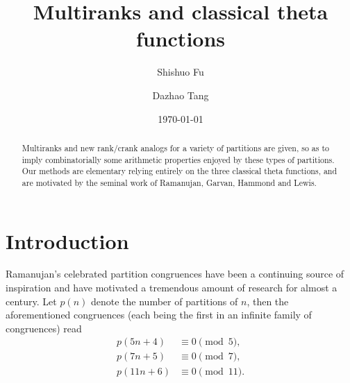 \documentclass[12pt]{amsart}
\numberwithin{equation}{section}
\theoremstyle{plain}
\theoremstyle{definition}
\begin{document}
\title[Multiranks and classical theta functions]{Multiranks and classical theta functions}


\author[S. Fu]{Shishuo Fu}
\address[Shishuo Fu]{College of Mathematics and Statistics, Chongqing University, Huxi Campus LD506, Chongqing 401331, P.R. China}


\author[D. Tang]{Dazhao Tang}

\address[Dazhao Tang]{College of Mathematics and Statistics, Chongqing University, Huxi Campus LD208, Chongqing 401331, P.R. China}

\date{\today}


\begin{abstract}
Multiranks and new rank/crank analogs for a variety of partitions are given, so as to imply combinatorially some arithmetic properties enjoyed by these types of partitions. Our methods are elementary relying entirely on the three classical theta functions, and are motivated by the seminal work of Ramanujan, Garvan, Hammond and Lewis.
\end{abstract}




\maketitle


\section{Introduction}\label{sec:intro}

Ramanujan's celebrated partition congruences have been a continuing source of inspiration and have motivated a tremendous amount of research for almost a century. Let $p(n)$ denote the number of partitions of $n$, then the aforementioned congruences (each being the first in an infinite family of congruences) read
\begin{align}
\label{p5}p(5n+4)&\equiv 0 \pmod 5,\\
\label{p7}p(7n+5)&\equiv 0 \pmod 7,\\
\label{p11}p(11n+6)&\equiv 0 \pmod {11}.
\end{align}
\end{document}
